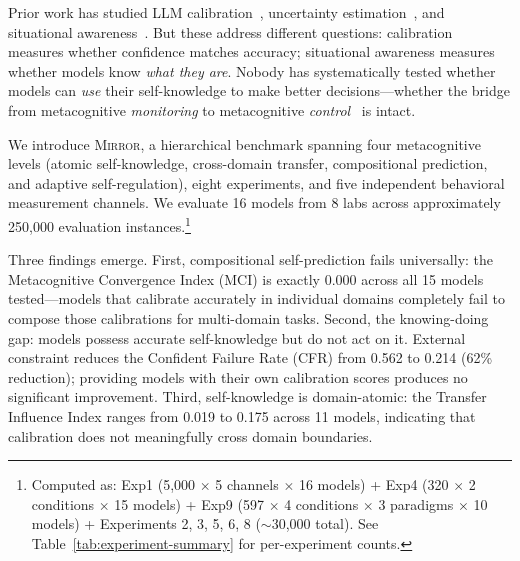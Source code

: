 \documentclass[10pt]{article}
\newcommand{\mirror}{\textsc{Mirror}}
\newcommand{\MCI}{MCI}
\newcommand{\CFR}{CFR}
\begin{document}
Prior work has studied LLM calibration~\citep{kadavath2022language,
kapoor2024calibration}, uncertainty estimation~\citep{lin2024generating}, and
situational awareness~\citep{laine2024me}. But these address different questions:
calibration measures whether confidence matches accuracy; situational awareness
measures whether models know \textit{what they are}. Nobody has systematically
tested whether models can \textit{use} their self-knowledge to make better
decisions---whether the bridge from metacognitive \textit{monitoring} to
metacognitive \textit{control}~\citep{nelson1990metamemory} is intact.

We introduce \mirror{}, a hierarchical benchmark spanning four metacognitive levels
(atomic self-knowledge, cross-domain transfer, compositional prediction, and
adaptive self-regulation), eight experiments, and five independent behavioral
measurement channels. We evaluate 16 models from 8 labs across approximately
250,000 evaluation instances.\footnote{Computed as: Exp1 (5,000 $\times$ 5 channels $\times$ 16 models) + Exp4 (320 $\times$ 2 conditions $\times$ 15 models) + Exp9 (597 $\times$ 4 conditions $\times$ 3 paradigms $\times$ 10 models) + Experiments 2, 3, 5, 6, 8 ($\sim$30,000 total). See Table~\ref{tab:experiment-summary} for per-experiment counts.}

Three findings emerge. First, compositional self-prediction fails universally: the
Metacognitive Convergence Index (\MCI{}) is exactly 0.000 across all 15 models
tested---models that calibrate accurately in individual domains completely fail to
compose those calibrations for multi-domain tasks. Second, the knowing-doing gap:
models possess accurate self-knowledge but do not act on it. External constraint
reduces the Confident Failure Rate (\CFR{}) from 0.562 to 0.214 (62\% reduction);
providing models with their own calibration scores produces no significant
improvement. Third, self-knowledge is domain-atomic: the Transfer Influence Index
ranges from 0.019 to 0.175 across 11 models, indicating that calibration does not
meaningfully cross domain boundaries.
\end{document}
